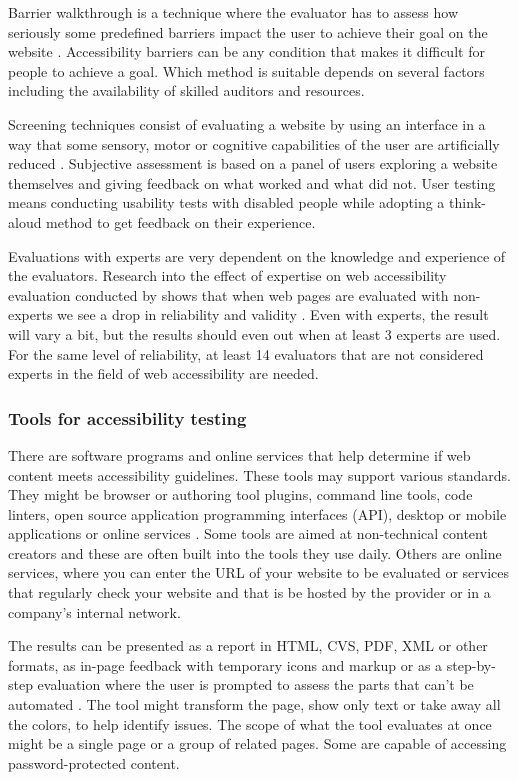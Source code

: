 \documentclass{master_thesis}
\begin{document}
Barrier walkthrough is a technique where the evaluator has to assess how seriously some predefined barriers impact the user to achieve their goal on the website \citep{Brajnik2008}. Accessibility barriers can be any condition that makes it difficult for people to achieve a goal. Which method is suitable depends on several factors including the availability of skilled auditors and resources.

Screening techniques consist of evaluating a website by using an interface in a way that some sensory, motor or cognitive capabilities of the user are artificially reduced \citep{Brajnik2008}. Subjective assessment is based on a panel of users exploring a website themselves and giving feedback on what worked and what did not. User testing means conducting usability tests with disabled people while adopting a think-aloud method to get feedback on their experience.

Evaluations with experts are very dependent on the knowledge and experience of the evaluators. Research into the effect of expertise on web accessibility evaluation conducted by \citeauthor{Brajnik2011} shows that when web pages are evaluated with non-experts we see a drop in reliability and validity \citep{Brajnik2011}. Even with experts, the result will vary a bit, but the results should even out when at least 3 experts are used. For the same level of reliability, at least 14 evaluators that are not considered experts in the field of web accessibility are needed.

\subsubsection{Tools for accessibility testing}

There are software programs and online services that help determine if web content meets accessibility guidelines. These tools may support various standards. They might be browser or authoring tool plugins, command line tools, code linters, open source application programming interfaces (API), desktop or mobile applications or online services \citep{AbouZahra2017}. Some tools are aimed at non-technical content creators and these are often built into the tools they use daily. Others are online services, where you can enter the URL of your website to be evaluated or services that regularly check your website and that is be hosted by the provider or in a company's internal network.

The results can be presented as a report in HTML, CVS, PDF, XML or other formats, as in-page feedback with temporary icons and markup or as a step-by-step evaluation where the user is prompted to assess the parts that can't be automated \citep{AbouZahra2017}. The tool might transform the page, show only text or take away all the colors, to help identify issues. The scope of what the tool evaluates at once might be a single page or a group of related pages. Some are capable of accessing password-protected content.
\end{document}
